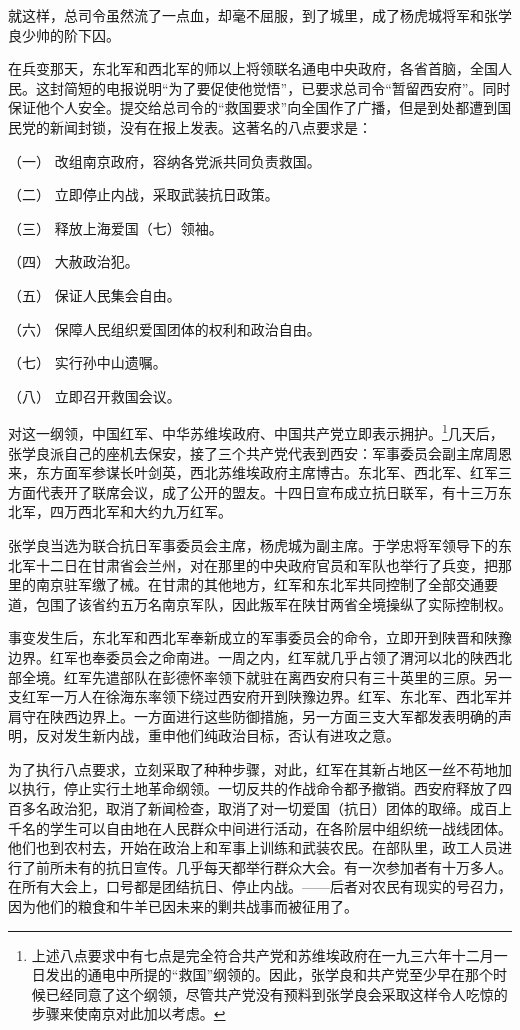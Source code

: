\documentclass[10pt]{book}
\begin{document}
就这样，总司令虽然流了一点血，却毫不屈服，到了城里，成了杨虎城将军和张学良少帅的阶下囚。

在兵变那天，东北军和西北军的师以上将领联名通电中央政府，各省首脑，全国人民。这封简短的电报说明“为了要促使他觉悟”，已要求总司令“暂留西安府”。同时保证他个人安全。提交给总司令的“救国要求”向全国作了广播，但是到处都遭到国民党的新闻封锁，没有在报上发表。这著名的八点要求是：

（一）     改组南京政府，容纳各党派共同负责救国。

（二）     立即停止内战，采取武装抗日政策。

（三）     释放上海爱国（七）领袖。

（四）     大赦政治犯。

（五）     保证人民集会自由。

（六）     保障人民组织爱国团体的权利和政治自由。

（七）     实行孙中山遗嘱。

（八）     立即召开救国会议。

对这一纲领，中国红军、中华苏维埃政府、中国共产党立即表示拥护。\footnote{上述八点要求中有七点是完全符合共产党和苏维埃政府在一九三六年十二月一日发出的通电中所提的“救国”纲领的。因此，张学良和共产党至少早在那个时候已经同意了这个纲领，尽管共产党没有预料到张学良会采取这样令人吃惊的步骤来使南京对此加以考虑。}几天后，张学良派自己的座机去保安，接了三个共产党代表到西安：军事委员会副主席周恩来，东方面军参谋长叶剑英，西北苏维埃政府主席博古。东北军、西北军、红军三方面代表开了联席会议，成了公开的盟友。十四日宣布成立抗日联军，有十三万东北军，四万西北军和大约九万红军。

张学良当选为联合抗日军事委员会主席，杨虎城为副主席。于学忠将军领导下的东北军十二日在甘肃省会兰州，对在那里的中央政府官员和军队也举行了兵变，把那里的南京驻军缴了械。在甘肃的其他地方，红军和东北军共同控制了全部交通要道，包围了该省约五万名南京军队，因此叛军在陕甘两省全境操纵了实际控制权。

事变发生后，东北军和西北军奉新成立的军事委员会的命令，立即开到陕晋和陕豫边界。红军也奉委员会之命南进。一周之内，红军就几乎占领了渭河以北的陕西北部全境。红军先遣部队在彭德怀率领下就驻在离西安府只有三十英里的三原。另一支红军一万人在徐海东率领下绕过西安府开到陕豫边界。红军、东北军、西北军并肩守在陕西边界上。一方面进行这些防御措施，另一方面三支大军都发表明确的声明，反对发生新内战，重申他们纯政治目标，否认有进攻之意。

为了执行八点要求，立刻采取了种种步骤，对此，红军在其新占地区一丝不苟地加以执行，停止实行土地革命纲领。一切反共的作战命令都予撤销。西安府释放了四百多名政治犯，取消了新闻检查，取消了对一切爱国（抗日）团体的取缔。成百上千名的学生可以自由地在人民群众中间进行活动，在各阶层中组织统一战线团体。他们也到农村去，开始在政治上和军事上训练和武装农民。在部队里，政工人员进行了前所未有的抗日宣传。几乎每天都举行群众大会。有一次参加者有十万多人。在所有大会上，口号都是团结抗日、停止内战。——后者对农民有现实的号召力，因为他们的粮食和牛羊已因未来的剿共战事而被征用了。
\end{document}
